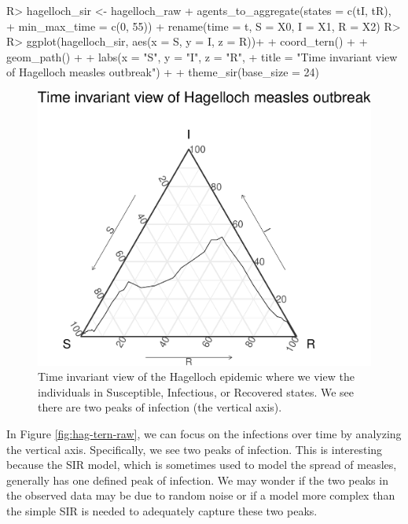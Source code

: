 \documentclass[
  shortnames]{jss}
\begin{document}
\begin{CodeChunk}
\begin{CodeInput}
R> hagelloch_sir <- hagelloch_raw %
+   agents_to_aggregate(states = c(tI, tR),
+                       min_max_time = c(0, 55)) %
+   rename(time = t, S = X0, I = X1, R = X2)
R> 
R> ggplot(hagelloch_sir, aes(x = S, y = I, z = R))+
+   coord_tern() +
+   geom_path() +
+   labs(x = "S", y = "I", z = "R",
+        title = "Time invariant view of Hagelloch measles outbreak") + 
+   theme_sir(base_size = 24)
\end{CodeInput}
\begin{figure}[H]

{\centering \includegraphics{Figs/unnamed-chunk-4-1} 

}

\caption{\label{fig:hag-tern-raw}Time invariant view of the Hagelloch epidemic where we view the individuals in Susceptible, Infectious, or Recovered states.  We see there are two peaks of infection (the vertical axis).}\label{fig:unnamed-chunk-4}
\end{figure}
\end{CodeChunk}

In Figure \ref{fig:hag-tern-raw}, we can focus on the infections over
time by analyzing the vertical axis. Specifically, we see two peaks of
infection. This is interesting because the SIR model, which is sometimes
used to model the spread of measles, generally has one defined peak of
infection. We may wonder if the two peaks in the observed data may be
due to random noise or if a model more complex than the simple SIR is
needed to adequately capture these two peaks.
\end{document}
